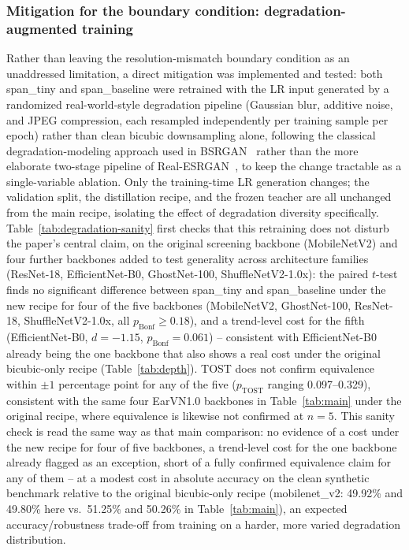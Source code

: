 \documentclass[11pt]{article}
\begin{document}
\subsubsection{Mitigation for the boundary condition: degradation-augmented training}
\label{sec:degradation-mitigation}

Rather than leaving the resolution-mismatch boundary condition as an unaddressed limitation, a direct mitigation was implemented and tested: both span\_tiny and span\_baseline were retrained with the LR input generated by a randomized real-world-style degradation pipeline (Gaussian blur, additive noise, and JPEG compression, each resampled independently per training sample per epoch) rather than clean bicubic downsampling alone, following the classical degradation-modeling approach used in BSRGAN~\cite{zhang2021designing} rather than the more elaborate two-stage pipeline of Real-ESRGAN~\cite{wang2021realesrgan}, to keep the change tractable as a single-variable ablation. Only the training-time LR generation changes; the validation split, the distillation recipe, and the frozen teacher are all unchanged from the main recipe, isolating the effect of degradation diversity specifically. Table~\ref{tab:degradation-sanity} first checks that this retraining does not disturb the paper's central claim, on the original screening backbone (MobileNetV2) and four further backbones added to test generality across architecture families (ResNet-18, EfficientNet-B0, GhostNet-100, ShuffleNetV2-1.0x): the paired $t$-test finds no significant difference between span\_tiny and span\_baseline under the new recipe for four of the five backbones (MobileNetV2, GhostNet-100, ResNet-18, ShuffleNetV2-1.0x, all $p_{\text{Bonf}}{\ge}0.18$), and a trend-level cost for the fifth (EfficientNet-B0, $d{=}{-}1.15$, $p_{\text{Bonf}}{=}0.061$) -- consistent with EfficientNet-B0 already being the one backbone that also shows a real cost under the original bicubic-only recipe (Table~\ref{tab:depth}). TOST does not confirm equivalence within $\pm 1$ percentage point for any of the five ($p_{\text{TOST}}$ ranging 0.097--0.329), consistent with the same four EarVN1.0 backbones in Table~\ref{tab:main} under the original recipe, where equivalence is likewise not confirmed at $n=5$. This sanity check is read the same way as that main comparison: no evidence of a cost under the new recipe for four of five backbones, a trend-level cost for the one backbone already flagged as an exception, short of a fully confirmed equivalence claim for any of them -- at a modest cost in absolute accuracy on the clean synthetic benchmark relative to the original bicubic-only recipe (mobilenet\_v2: 49.92\% and 49.80\% here vs.\ 51.25\% and 50.26\% in Table~\ref{tab:main}), an expected accuracy/robustness trade-off from training on a harder, more varied degradation distribution.
\end{document}
